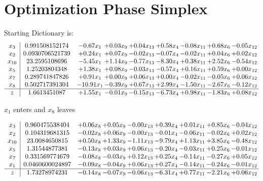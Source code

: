 \documentclass[9pt]{article}
\begin{document}
\section{Optimization Phase Simplex}
Starting Dictionary is:
\[\begin{array}{c| c c@{\hskip 2pt} c@{\hskip 2pt} c@{\hskip 2pt} c@{\hskip 2pt} c@{\hskip 2pt} c@{\hskip 2pt} c@{\hskip 2pt} }
 x_{3}   &  0.991508152174 & -0.67 x_{1} & +  0.03 x_{9} & +  0.04 x_{13} & +  0.58 x_{4} & -0.08 x_{11} & +  0.68 x_{6} & -0.05 x_{12}\\
 x_{2}   &  0.0930706521739 & +  0.24 x_{1} & +  0.07 x_{9} & -0.02 x_{13} & -0.07 x_{4} & -0.02 x_{11} & +  0.04 x_{6} & +  0.02 x_{12}\\
 x_{10}   &  23.2595108696 & -5.45 x_{1} & +  1.14 x_{9} & -0.77 x_{13} & -8.30 x_{4} & +  0.38 x_{11} & +  2.52 x_{6} & -0.54 x_{12}\\
 x_{5}   &  1.25203804348 & +  1.38 x_{1} & +  0.08 x_{9} & -0.03 x_{13} & -0.57 x_{4} & +  0.16 x_{11} & +  0.59 x_{6} & +  0.00 x_{12}\\
 x_{7}   &  0.289741847826 & +  0.91 x_{1} & +  0.00 x_{9} & +  0.06 x_{13} & +  0.00 x_{4} & -0.02 x_{11} & -0.05 x_{6} & +  0.06 x_{12}\\
 x_{8}   &  0.502717391304 & -10.91 x_{1} & -0.39 x_{9} & +  0.67 x_{13} & +  2.99 x_{4} & -1.50 x_{11} & -2.67 x_{6} & -0.12 x_{12}\\
\hline
z    &  1.6613451087 & +  1.55 x_{1} & -0.01 x_{9} & -0.15 x_{13} & -6.73 x_{4} & +  0.98 x_{11} & -1.83 x_{6} & +  0.08 x_{12}\\
\end{array}\]


 $ x_{1} $ enters and $ x_{8} $ leaves 

 \[\begin{array}{c| c c@{\hskip 2pt} c@{\hskip 2pt} c@{\hskip 2pt} c@{\hskip 2pt} c@{\hskip 2pt} c@{\hskip 2pt} c@{\hskip 2pt} }
 x_{3}   &  0.960475538404 & +  0.06 x_{8} & +  0.05 x_{9} & -0.00 x_{13} & +  0.39 x_{4} & +  0.01 x_{11} & +  0.85 x_{6} & -0.04 x_{12}\\
 x_{2}   &  0.104319681315 & -0.02 x_{8} & +  0.06 x_{9} & -0.00 x_{13} & -0.01 x_{4} & -0.06 x_{11} & -0.02 x_{6} & +  0.02 x_{12}\\
 x_{10}   &  23.0084650815 & +  0.50 x_{8} & +  1.33 x_{9} & -1.11 x_{13} & -9.79 x_{4} & +  1.13 x_{11} & +  3.85 x_{6} & -0.48 x_{12}\\
 x_{5}   &  1.31544877381 & -0.13 x_{8} & +  0.03 x_{9} & +  0.06 x_{13} & -0.20 x_{4} & -0.03 x_{11} & +  0.25 x_{6} & -0.01 x_{12}\\
 x_{7}   &  0.331569774679 & -0.08 x_{8} & -0.03 x_{9} & +  0.12 x_{13} & +  0.25 x_{4} & -0.14 x_{11} & -0.27 x_{6} & +  0.05 x_{12}\\
 x_{1}   &  0.0460600024897 & -0.09 x_{8} & -0.04 x_{9} & +  0.06 x_{13} & +  0.27 x_{4} & -0.14 x_{11} & -0.24 x_{6} & -0.01 x_{12}\\
\hline
z    &  1.73278974231 & -0.14 x_{8} & -0.07 x_{9} & -0.06 x_{13} & -6.31 x_{4} & +  0.77 x_{11} & -2.21 x_{6} & +  0.06 x_{12}\\
\end{array}\]
\end{document}
